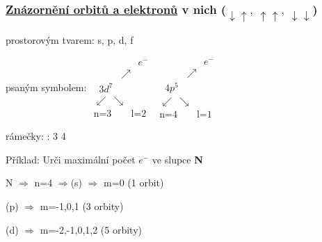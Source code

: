 \subsubsection{\underline{Znázornění orbitů a elektronů} v nich ($\downarrow \uparrow,~ \uparrow \uparrow,~ \downarrow\downarrow$)}
\begin{description}
    \TabPositions{0em, 12em}
    \vspace{1em}
    \item[a)] prostorovým tvarem: \tab s, p, d, f
    \vspace{2em}
    \item[b)] psaným symbolem: \tab \(
        \begin{array}{c}
            \qquad\qquad\;\; e^-\\
            \qquad \;\;\; \nearrow \\
            \;\;3d^7 \\
            \swarrow~\searrow \\
            \mbox{n=3} \qquad \mbox{l=2}
        \end{array}
    \)
    \hspace{6em}
    \(
        \begin{array}{c}
            \qquad\qquad\;\; e^-\\
            \qquad \;\;\; \nearrow \\
            \;\;4p^5 \\
            \swarrow~\searrow \\
            \mbox{n=4} \qquad \mbox{l=1}
        \end{array}
    \)
    \vspace{2em}
    \item[c)] rámečky: \tab  : 3 \fbox{$\downarrow\uparrow$}\fbox{$\downarrow\uparrow$}\fbox{$\downarrow$ }\fbox{$\downarrow$ }\fbox{$\downarrow$ } \hspace{3em} 4 \fbox{$\downarrow\uparrow$}\fbox{$\downarrow\uparrow$}\fbox{$\downarrow$ }
\end{description}

\newpage
{}
Příklad: Urči maximální počet $e^-$ ve slupce \textbf{N}

\smallskip
\TabPositions{0em, 7em}
N $\Rightarrow$ n=4 $\Rightarrow$(s) $\Rightarrow$ m=0 (1 orbit)

    (p) $\Rightarrow$ m=-1,0,1 (3 orbity)

    (d) $\Rightarrow$ m=-2,-1,0,1,2 (5 orbity)

